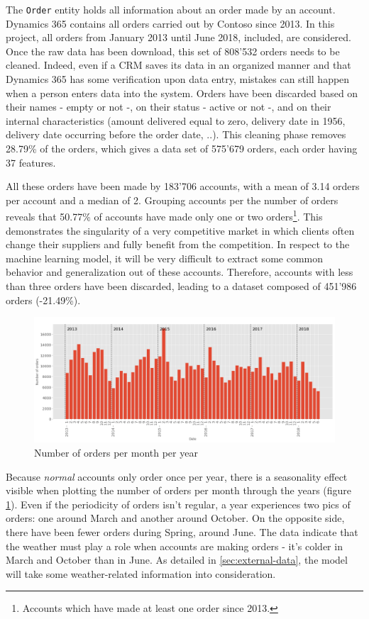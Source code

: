 The \texttt{Order} entity holds all information about an order made by an account. Dynamics 365 contains all orders carried out by Contoso since 2013. In this project, all orders from January 2013 until June 2018, included, are considered. Once the raw data has been download, this set of 808'532 orders needs to be cleaned. Indeed, even if a CRM saves its data in an organized manner and that Dynamics 365 has some verification upon data entry, mistakes can still happen when a person enters data into the system. Orders have been discarded based on their names - empty or not -, on their status - active or not -, and on their internal characteristics (amount delivered equal to zero, delivery date in 1956, delivery date occurring before the order date, ..). This cleaning phase removes 28.79\% of the orders, which gives a data set of 575'679 orders, each order having 37 features.

All these orders have been made by 183'706 accounts, with a mean of 3.14 orders per account and a median of 2. Grouping accounts per the number of orders reveals that 50.77\% of accounts have made only one or two orders\footnote{Accounts which have made at least one order since 2013.}. This demonstrates the singularity of a very competitive market in which clients often change their suppliers and fully benefit from the competition. In respect to the machine learning model, it will be very difficult to extract some common behavior and generalization out of these accounts. Therefore, accounts with less than three orders have been discarded, leading to a dataset composed of 451'986 orders (-21.49\%).

\begin{figure}[h]
    \centering
    \includegraphics[width=15cm]{images/order_month_year.png}
    \caption{Number of orders per month per year}
    \label{fig:order_per_monthyear}
\end{figure}

Because \textit{normal} accounts only order once per year, there is a seasonality effect visible when plotting the number of orders per month through  the years (figure \ref{fig:order_per_monthyear}). Even if the periodicity of orders isn't regular, a year experiences two pics of orders: one around March and another around October. On the opposite side, there have been fewer orders during Spring, around June. The data indicate that the weather must play a role when accounts are making orders - it's colder in March and October than in June. As detailed in \ref{sec:external-data}, the model will take some weather-related information into consideration.

